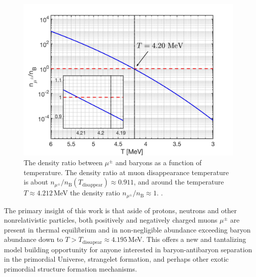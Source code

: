 \begin{figure}
\centerline{\includegraphics[width=0.9\linewidth]{./plots/DensityRatio_new2.jpg}}
\caption{The density ratio between $\mu^\pm$ and baryons as a function of temperature. The density ratio at muon disappearance temperature is about $n_{\mu^\pm}/n_\mathrm{B}(T_\mathrm{disappear})\approx0.911$, and around the temperature $T\approx4.212$\,MeV the density ratio $n_{\mu^\pm}/n_\mathrm{B}\approx1$. . }
\label{fig:DensityRatio}
\end{figure}

The primary insight of this work is that aside of protons, neutrons and other nonrelativistic particles, both positively and negatively charged muons $\mu^\pm$ are present in thermal equilibrium and in non-negligible abundance exceeding baryon abundance down to  $T>T_\mathrm{dissapear}\approx 4.195$\,MeV. This offers a new and tantalizing model building opportunity for anyone interested in baryon-antibaryon separation in the primordial Universe, strangelet formation, and perhaps other exotic primordial structure formation mechanisms. 



